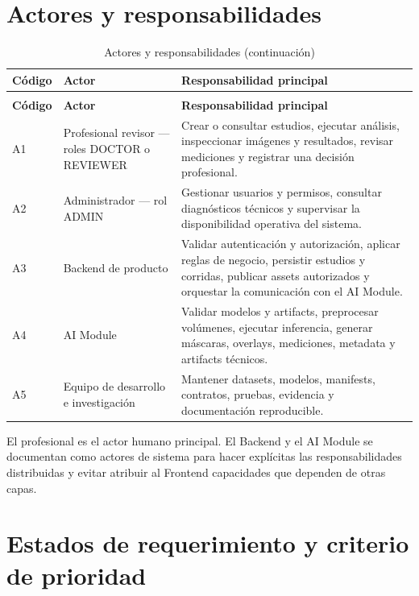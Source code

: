 \section{Actores y responsabilidades}

{\small
\setlength{\LTleft}{0pt}
\setlength{\LTright}{0pt}
\setlength{\tabcolsep}{2pt}
\renewcommand{\arraystretch}{1.18}
\begin{longtable}{>{\raggedright\arraybackslash}p{} >{\raggedright\arraybackslash}p{} >{\raggedright\arraybackslash}p{}}
\caption{Actores y responsabilidades}\label{tab:req-actores}\\
\hline
\textbf{Código} & \textbf{Actor} & \textbf{Responsabilidad principal} \\
\hline
\endfirsthead
\caption[]{Actores y responsabilidades (continuación)}\\
\hline
\textbf{Código} & \textbf{Actor} & \textbf{Responsabilidad principal} \\
\hline
\endhead
\hline
\endfoot
A1 & Profesional revisor — roles DOCTOR o REVIEWER & Crear o consultar estudios, ejecutar análisis, inspeccionar imágenes y resultados, revisar mediciones y registrar una decisión profesional. \\
A2 & Administrador — rol ADMIN & Gestionar usuarios y permisos, consultar diagnósticos técnicos y supervisar la disponibilidad operativa del sistema. \\
A3 & Backend de producto & Validar autenticación y autorización, aplicar reglas de negocio, persistir estudios y corridas, publicar assets autorizados y orquestar la comunicación con el AI Module. \\
A4 & AI Module & Validar modelos y artifacts, preprocesar volúmenes, ejecutar inferencia, generar máscaras, overlays, mediciones, metadata y artifacts técnicos. \\
A5 & Equipo de desarrollo e investigación & Mantener datasets, modelos, manifests, contratos, pruebas, evidencia y documentación reproducible. \\
\hline
\end{longtable}
}

El profesional es el actor humano principal. El Backend y el AI Module se documentan como actores de sistema para hacer explícitas las responsabilidades distribuidas y evitar atribuir al Frontend capacidades que dependen de otras capas.

\section{Estados de requerimiento y criterio de prioridad}


